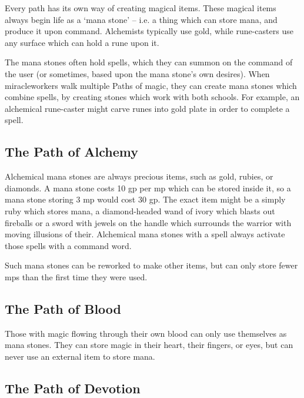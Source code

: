 \begin{multicols}{2}

\noindent
Every path has its own way of creating magical items.
These magical items always begin life as a `mana stone' -- i.e. a thing which can store mana, and produce it upon command.
Alchemists typically use gold, while rune-casters use any surface which can hold a rune upon it.

The mana stones often hold spells, which they can summon on the command of the user (or sometimes, based upon the mana stone's own desires).
When \glspl{miracleworker} walk multiple Paths of magic, they can create mana stones which combine spells, by creating stones which work with both schools.
For example, an alchemical rune-caster might carve runes into gold plate in order to complete a spell.

\subsection{The Path of Alchemy}


Alchemical mana stones are always precious items, such as gold, rubies, or diamonds.
A mana stone costs 10 gp per \gls{mp} which can be stored inside it, so a mana stone storing 3 \gls{mp} would cost 30 gp.
The exact item might be a simply ruby which stores mana, a diamond-headed wand of ivory which blasts out fireballs or a sword with jewels on the handle which surrounds the warrior with moving illusions of their.
Alchemical mana stones with a spell always activate those spells with a command word.

Such mana stones can be reworked to make other items, but can only store fewer \glspl{mp} than the first time they were used.

\subsection{The Path of Blood}


Those with magic flowing through their own blood can only use themselves as mana stones.
They can store magic in their heart, their fingers, or eyes, but can never use an external item to store mana.

\subsection{The Path of Devotion}



\end{multicols}
